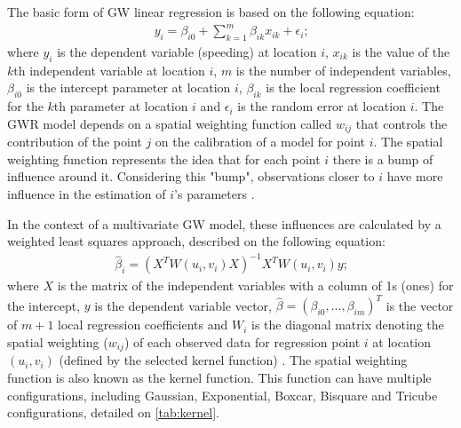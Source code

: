 The basic form of GW linear regression is based on the following equation:\begin{align}
    y_i = \beta_{i0} + \sum_{k=1}^{m} \beta_{ik} x_{ik} + \epsilon_i \mbox{;}
    \label{eq:gwr}
\end{align} where $y_i$ is the dependent variable (speeding) at location $i$, $x_{ik}$ is the value of the $k$th independent variable at location $i$, $m$ is the number of independent variables, $\beta_{i0}$ is the intercept parameter at location $i$, $\beta_{ik}$ is the local regression coefficient for the $k$th parameter at location $i$ and $\epsilon_i$ is the random error at location $i$. The GWR model depends on a spatial weighting function called $w_{ij}$ that controls the contribution of the point $j$ on the calibration of a model for point $i$. The spatial weighting function represents the idea that for each point $i$ there is a bump of influence around it. Considering this "bump", observations closer to $i$ have more influence in the estimation of $i$'s parameters \cite{Brunsdon2010,Gollini2013}.

In the context of a multivariate GW model, these influences are calculated by a weighted least squares approach, described on the following equation: \begin{align}
    \hat{\beta}_i = (X^T W(u_i,v_i)X)^{-1} X^T W(u_i, v_i)y \mbox{;}
    \label{eq:wls}
\end{align} where $X$ is the matrix of the independent variables with a column of 1s (ones) for the intercept, $y$ is the dependent variable vector, $\hat{\beta} = (\beta_{i0},...,\beta_{im})^T$ is the vector of $m + 1$ local regression coefficients and $W_i$ is the diagonal matrix denoting the spatial weighting ($w_{ij}$) of each observed data for regression point $i$ at location $(u_i, v_i)$ (defined by the selected kernel function) \cite{Gollini2013}. The spatial weighting function is also known as the kernel function. This function can have multiple configurations, including Gaussian, Exponential, Boxcar, Bisquare and Tricube configurations, detailed on \autoref{tab:kernel}.

\vspace{\baselineskip}

